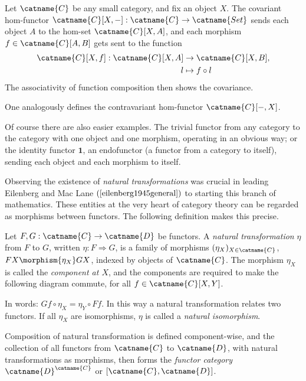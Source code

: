 \begin{example}
Let $\catname{C}$ be any small category, and fix an object $X$. The covariant hom-functor $\catname{C}[X,-]:\catname{C}\rightarrow \catname{Set}$ sends each object $A$ to the hom-set $\catname{C}[X,A]$, and each morphism $f\in\catname{C}[A,B]$ gets sent to the function
\begin{align*}
\catname{C}[X,f]:\catname{C}[X,A] &\rightarrow \catname{C}[X,B],\\
l &\mapsto f\circ l
\end{align*}
The associativity of function composition then shows the covariance.

One analogously defines the contravariant hom-functor $\catname{C}[-,X]$.
\end{example}
Of course there are also easier examples. The trivial functor from any category to the category with one object and one morphism, operating in an obvious way; or the identity functor $\mathbf{1}$, an endofunctor (a functor from a category to itself), sending each object and each morphism to itself.

\bigno
Observing the existence of \emph{natural transformations} was crucial in leading Eilenberg and Mac Lane $\left( \cite{eilenberg1945general} \right)$ to starting this branch of mathematics. These entities at the very heart of category theory can be regarded as morphisms between functors. The following definition makes this precise.

\begin{definition}
Let $F,G:\catname{C}\rightarrow\catname{D}$ be functors. A \emph{natural transformation} $\eta$ from $F$ to $G$, written $\eta:F\Rightarrow G$, is a family of morphisms $(\eta_X)_{X\in \catname{C}}$, $FX\morphism{\eta_X} GX$, indexed by objects of $\catname{C}$. The morphism $\eta_X$ is called the \emph{component at $X$}, and the components are required to make the following diagram commute, for all $f\in \catname{C}[X,Y]$.

\begin{figure}[!htp]\centering
{}
\end{figure}
In words: $Gf\circ\eta_X = \eta_Y \circ Ff$. In this way a natural transformation relates two functors. If all $\eta_X$ are isomorphisms, $\eta$ is called a \emph{natural isomorphism}.
\end{definition}
Composition of natural transformation is defined component-wise, and the collection of all functors from $\catname{C}$ to $\catname{D}$, with natural transformations as morphisms, then forms the \emph{functor category} $\catname{D}^\catname{C}$ or $[\catname{C},\catname{D}]$.

